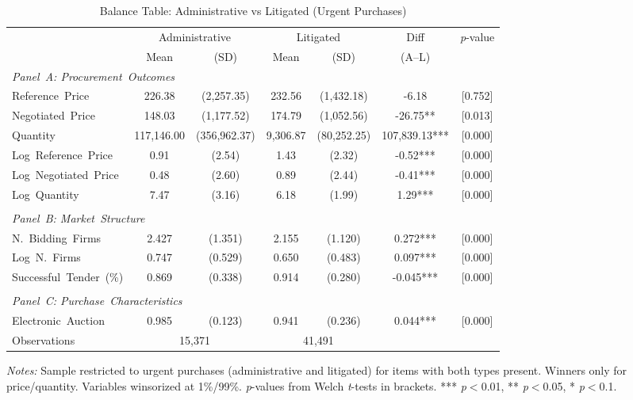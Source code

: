 \begin{table}[ht]
  \centering
  \caption{Balance Table: Administrative vs Litigated (Urgent Purchases)}
  \label{tab:balance}
  \small
  \begin{threeparttable}
  \begin{tabular}{lcccccc}
    \hline\hline
    & \multicolumn{2}{c}{Administrative} & \multicolumn{2}{c}{Litigated} & Diff & \textit{p}-value \\
    \cmidrule(lr){2-3} \cmidrule(lr){4-5}
    & Mean & (SD) & Mean & (SD) & (A--L) & \\
    \hline
    \multicolumn{7}{l}{\textit{Panel~A: Procurement~Outcomes}} \\[3pt]
    Reference~Price & 226.38 & (2,257.35) & 232.56 & (1,432.18) & -6.18 & [0.752] \\
    Negotiated~Price & 148.03 & (1,177.52) & 174.79 & (1,052.56) & -26.75** & [0.013] \\
    Quantity & 117,146.00 & (356,962.37) & 9,306.87 & (80,252.25) & 107,839.13*** & [0.000] \\
    Log~Reference~Price & 0.91 & (2.54) & 1.43 & (2.32) & -0.52*** & [0.000] \\
    Log~Negotiated~Price & 0.48 & (2.60) & 0.89 & (2.44) & -0.41*** & [0.000] \\
    Log~Quantity & 7.47 & (3.16) & 6.18 & (1.99) & 1.29*** & [0.000] \\
    \\[3pt]
    \multicolumn{7}{l}{\textit{Panel~B: Market~Structure}} \\[3pt]
    N.~Bidding~Firms & 2.427 & (1.351) & 2.155 & (1.120) & 0.272*** & [0.000] \\
    Log~N.~Firms & 0.747 & (0.529) & 0.650 & (0.483) & 0.097*** & [0.000] \\
    Successful~Tender~(\%) & 0.869 & (0.338) & 0.914 & (0.280) & -0.045*** & [0.000] \\
    \\[3pt]
    \multicolumn{7}{l}{\textit{Panel~C: Purchase~Characteristics}} \\[3pt]
    Electronic~Auction & 0.985 & (0.123) & 0.941 & (0.236) & 0.044*** & [0.000] \\
    \hline
    Observations & \multicolumn{2}{c}{15,371} & \multicolumn{2}{c}{41,491} & & \\
    \hline\hline
  \end{tabular}
  \begin{tablenotes}
    \small
    \item \textit{Notes:} Sample restricted to urgent purchases (administrative and litigated) for items with both types present. Winners only for price/quantity. Variables winsorized at 1\%/99\%. \textit{p}-values from Welch \textit{t}-tests in brackets. *** \textit{p}$<$0.01, ** \textit{p}$<$0.05, * \textit{p}$<$0.1.
  \end{tablenotes}
  \end{threeparttable}
\end{table}
